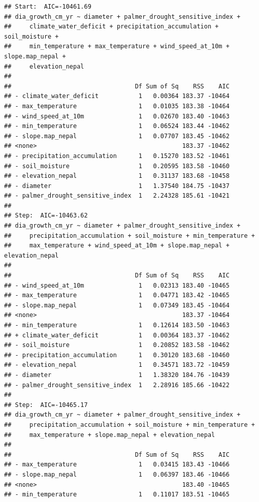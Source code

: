 \documentclass[
]{article}
\begin{document}
\begin{verbatim}
## Start:  AIC=-10461.69
## dia_growth_cm_yr ~ diameter + palmer_drought_sensitive_index + 
##     climate_water_deficit + precipitation_accumulation + soil_moisture + 
##     min_temperature + max_temperature + wind_speed_at_10m + slope.map_nepal + 
##     elevation_nepal
## 
##                                  Df Sum of Sq    RSS    AIC
## - climate_water_deficit           1   0.00364 183.37 -10464
## - max_temperature                 1   0.01035 183.38 -10464
## - wind_speed_at_10m               1   0.02670 183.40 -10463
## - min_temperature                 1   0.06524 183.44 -10462
## - slope.map_nepal                 1   0.07707 183.45 -10462
## <none>                                        183.37 -10462
## - precipitation_accumulation      1   0.15270 183.52 -10461
## - soil_moisture                   1   0.20595 183.58 -10460
## - elevation_nepal                 1   0.31137 183.68 -10458
## - diameter                        1   1.37540 184.75 -10437
## - palmer_drought_sensitive_index  1   2.24328 185.61 -10421
## 
## Step:  AIC=-10463.62
## dia_growth_cm_yr ~ diameter + palmer_drought_sensitive_index + 
##     precipitation_accumulation + soil_moisture + min_temperature + 
##     max_temperature + wind_speed_at_10m + slope.map_nepal + elevation_nepal
## 
##                                  Df Sum of Sq    RSS    AIC
## - wind_speed_at_10m               1   0.02313 183.40 -10465
## - max_temperature                 1   0.04771 183.42 -10465
## - slope.map_nepal                 1   0.07349 183.45 -10464
## <none>                                        183.37 -10464
## - min_temperature                 1   0.12614 183.50 -10463
## + climate_water_deficit           1   0.00364 183.37 -10462
## - soil_moisture                   1   0.20852 183.58 -10462
## - precipitation_accumulation      1   0.30120 183.68 -10460
## - elevation_nepal                 1   0.34571 183.72 -10459
## - diameter                        1   1.38320 184.76 -10439
## - palmer_drought_sensitive_index  1   2.28916 185.66 -10422
## 
## Step:  AIC=-10465.17
## dia_growth_cm_yr ~ diameter + palmer_drought_sensitive_index + 
##     precipitation_accumulation + soil_moisture + min_temperature + 
##     max_temperature + slope.map_nepal + elevation_nepal
## 
##                                  Df Sum of Sq    RSS    AIC
## - max_temperature                 1   0.03415 183.43 -10466
## - slope.map_nepal                 1   0.06397 183.46 -10466
## <none>                                        183.40 -10465
## - min_temperature                 1   0.11017 183.51 -10465

\end{verbatim}
\end{document}
